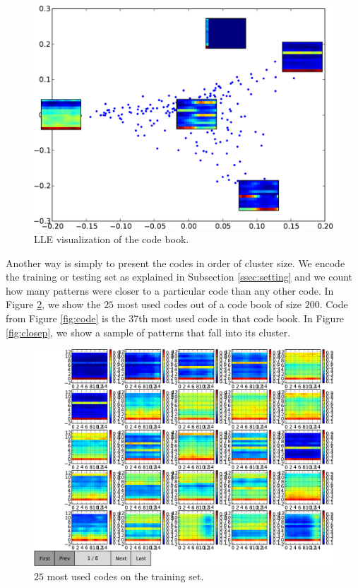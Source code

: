 \documentclass{article}
\begin{document}
\begin{figure}[htb]
\begin{center}
\includegraphics[width=.9\columnwidth]{codes_lle}
\end{center}
\caption{{LLE visualization of the code book.}}
\label{fig:lle}
\end{figure}

Another way is simply to present the codes in order of cluster size.
We encode the training or testing set as explained in Subsection 
\ref{ssec:setting} and we count how many patterns were closer to a particular
code than any other code. In Figure \ref{fig:firstcodes}, we show the $25$
most used codes out of a code book of size $200$.
Code from Figure \ref{fig:code} is the 37th most used code in that
code book. In Figure \ref{fig:closep}, we show a sample of patterns that
fall into its cluster.


\begin{figure}[htb]
\begin{center}
\includegraphics[width=.9\columnwidth]{codes1}
\end{center}
\caption{{$25$ most used codes on the training set.}}
\label{fig:firstcodes}
\end{figure}
\end{document}

